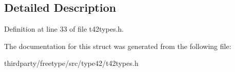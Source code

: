 \subsection{Detailed Description}


Definition at line 33 of file t42types.\+h.



The documentation for this struct was generated from the following file\+:\begin{DoxyCompactItemize}
\item 
thirdparty/freetype/src/type42/t42types.\+h\end{DoxyCompactItemize}

